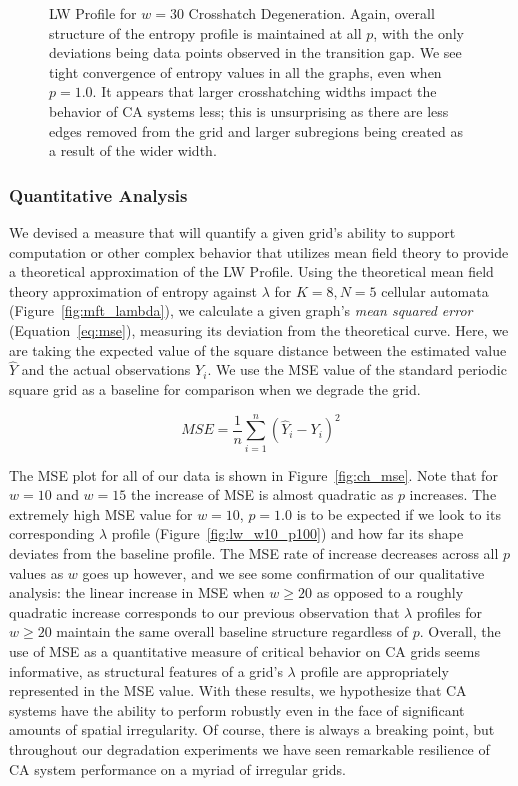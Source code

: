 \documentclass[a4paper,11pt]{article}
\begin{document}
\begin{figure}[htp]
\caption[Crosshatch Langton-Wootters Profile, $w=30$]{
  LW Profile for $w=30$ Crosshatch Degeneration. Again, overall structure of the entropy profile is maintained at all $p$, with the only deviations being data points observed in the transition gap. We see tight convergence of entropy values in all the graphs, even when $p=1.0$.  It appears that larger crosshatching widths impact the behavior of CA systems less; this is unsurprising as there are less edges removed from the grid and larger subregions being created as a result of the wider width.
}

\label{fig:lw_ch_30}
\end{figure}

\subsubsection*{Quantitative Analysis}
\label{subsec:ch6_mse}
We devised a measure that will quantify a given grid's ability to support computation or other complex behavior that utilizes mean field theory to provide a theoretical approximation of the LW Profile. Using the theoretical mean field theory approximation of entropy against $\lambda$ for $K=8, N=5$ cellular automata (Figure~\ref{fig:mft_lambda}), we calculate a given graph's \textit{mean squared error} (Equation~\ref{eq:mse}), measuring its deviation from the theoretical curve. Here, we are taking the expected value of the square distance between the estimated value $\hat{Y}$ and the actual observations $Y_i$. We use the MSE value of the standard periodic square grid as a baseline for comparison when we degrade the grid.

\begin{equation}
MSE = \frac{1}{n}\sum^n_{i=1}(\hat{Y}_i - Y_i)^2
\label{eq:mse}
\end{equation}

The MSE plot for all of our data is shown in Figure~\ref{fig:ch_mse}. Note that for $w=10$ and $w=15$ the increase of MSE is almost quadratic as $p$ increases. The extremely high MSE value for $w=10$, $p=1.0$ is to be expected if we look to its corresponding $\lambda$ profile (Figure~\ref{fig:lw_w10_p100}) and how far its shape deviates from the baseline profile. The MSE rate of increase decreases across all $p$ values as $w$ goes up however, and we see some confirmation of our qualitative analysis: the linear increase in MSE when $w \ge 20$ as opposed to a roughly quadratic increase corresponds to our previous observation that $\lambda$ profiles for $w \ge 20$ maintain the same overall baseline structure regardless of $p$. Overall, the use of MSE as a quantitative measure of critical behavior on CA grids seems informative, as structural features of a grid's $\lambda$ profile are appropriately represented in the MSE value. With these results, we hypothesize that CA systems have the ability to perform robustly even in the face of significant amounts of spatial irregularity. Of course, there is always a breaking point, but throughout our degradation experiments we have seen remarkable resilience of CA system performance on a myriad of irregular grids.
\end{document}
